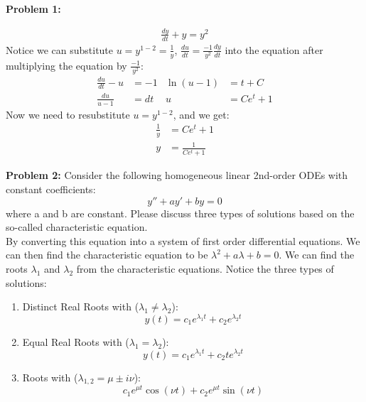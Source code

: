 \documentclass[11pt]{article}
\newenvironment{problem}[1]{\textbf{Problem #1: }}{\newpage}
\begin{document}
\begin{problem}{1}
\begin{enumerate}[label = (\alph*)]
			\begin{align*}
				\frac{dy}{dt} + y = y^2
			\end{align*}
			Notice we can substitute $u=y^{1-2} = \frac{1}{y}$, $\frac{du}{dt} = \frac{-1}{y^2}\frac{dy}{dt}$ into the equation after multiplying the equation by $\frac{-1}{y^2}$:
			\begin{align*}
				\frac{du}{dt} - u &= -1 & \ln(u-1) &= t + C \\
				\frac{du}{u - 1} &= dt & u &= Ce^{t} + 1
			\end{align*}
			Now we need to resubstitute $u=y^{1-2}$, and we get:
			\begin{align*}
				\frac{1}{y} &= Ce^{t} + 1 \\
				y &= \frac{1}{Ce^{t} + 1}
			\end{align*} 
		\end{enumerate}
	\end{problem}

	\begin{problem}{2}
		Consider the following homogeneous linear 2nd-order ODEs
		with constant coefficients:
		$$y'' + ay' + by = 0$$
		where a and b are constant. Please discuss three types of solutions based on
		the so-called characteristic equation. \\

		By converting this equation into a system of first order differential equations.  We can then find the characteristic equation to be $\lambda^2 + a\lambda + b = 0$.  We can find the roots $\lambda_1$ and $\lambda_2$ from the characteristic equations. Notice the three types of solutions: \\
			\begin{enumerate}[label = (\alph*)]
				\item Distinct Real Roots with ($\lambda_1 \not = \lambda_2$):
				$$y(t) = c_1e^{\lambda_1 t} + c_2e^{\lambda_2 t}$$
				\item Equal Real Roots with ($\lambda_1 = \lambda_2$):
				$$y(t) = c_1e^{\lambda_1 t} + c_2te^{\lambda_2 t}$$
				\item Roots with ($\lambda_{1,2} = \mu \pm i\nu$):
				$$c_1e^{\mu t}\cos(\nu t) + c_2e^{\mu t}\sin(\nu t)$$
			\end{enumerate}
	\end{problem}
\end{document}

